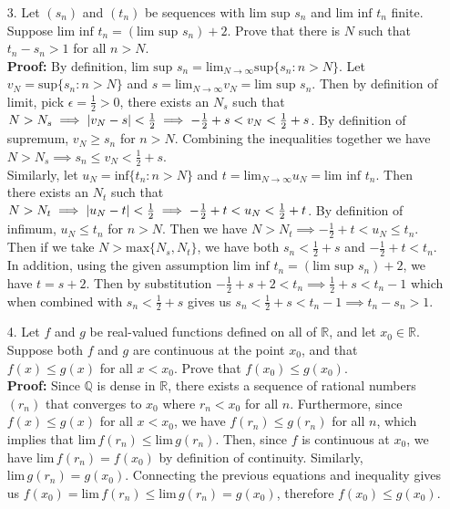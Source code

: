 \documentclass{article}
\begin{document}
\begin{itemize}
\end{itemize}
\newpage
\begin{itemize}
    \item [3.] Let $(s_n)$ and $(t_n)$ be sequences with $\text{lim sup }s_n$ and $\text{lim inf }t_n$ finite. Suppose $\text{lim inf }t_n=(\text{lim sup }s_n)+2$. Prove that there is $N$ such that $t_n-s_n>1$ for all $n>N$.\\
          \textbf{Proof: } By definition, $\text{lim sup }s_n=\text{lim}_{N\rightarrow\infty}\text{sup}\{s_n:n>N\}$. Let $v_N=\text{sup}\{s_n:n>N\}$ and $s=\text{lim}_{N\rightarrow\infty}v_N=\text{lim sup }s_n$. Then by definition of limit, pick $\epsilon=\frac{1}{2}>0$, there exists an $N_s$ such that $N>N_s\implies\abs{v_N-s}<\frac{1}{2}\implies -\frac{1}{2}+s<v_N<\frac{1}{2}+s$. By definition of supremum, $v_N\geq s_n$ for $n>N$. Combining the inequalities together we have $N>N_s\implies s_n\leq v_N<\frac{1}{2}+s$.\\
          Similarly, let $u_N=\text{inf}\{t_n:n>N\}$ and $t=\text{lim}_{N\rightarrow\infty}u_N=\text{lim inf }t_n$. Then there exists an $N_t$ such that $N>N_t\implies\abs{u_N-t}<\frac{1}{2}\implies -\frac{1}{2}+t<u_N<\frac{1}{2}+t$. By definition of infimum, $u_N\leq t_n$ for $n>N$. Then we have $N>N_t\implies -\frac{1}{2}+t<u_N\leq t_n$.\\
          Then if we take $N>\text{max}\{N_s,N_t\}$, we have both $s_n<\frac{1}{2}+s$ and $-\frac{1}{2}+t<t_n$. In addition, using the given assumption $\text{lim inf }t_n=(\text{lim sup }s_n)+2$, we have $t=s+2$. Then by substitution $-\frac{1}{2}+s+2<t_n\implies\frac{1}{2}+s<t_n-1$ which when combined with $s_n<\frac{1}{2}+s$ gives us $s_n<\frac{1}{2}+s<t_n-1\implies t_n-s_n>1$.
\end{itemize}
\newpage
\begin{itemize}
    \item [4.] Let $f$ and $g$ be real-valued functions defined on all of $\mathbb{R}$, and let $x_0\in\mathbb{R}$. Suppose both $f$ and $g$ are continuous at the point $x_0$, and that $f(x)\leq g(x)$ for all $x<x_0$. Prove that $f(x_0)\leq g(x_0)$.\\
          \textbf{Proof: } Since $\mathbb{Q}$ is dense in $\mathbb{R}$, there exists a sequence of rational numbers $(r_n)$ that converges to $x_0$ where $r_n<x_0$ for all $n$. Furthermore, since $f(x)\leq g(x)$ for all $x<x_0$, we have $f(r_n)\leq g(r_n)$ for all $n$, which implies that $\text{lim}\,f(r_n)\leq\text{lim}\,g(r_n)$. Then, since $f$ is continuous at $x_0$, we have $\text{lim}\,f(r_n)=f(x_0)$ by definition of continuity. Similarly, $\text{lim}\,g(r_n)=g(x_0)$. Connecting the previous equations and inequality gives us $f(x_0)=\text{lim}\,f(r_n)\leq\text{lim}\,g(r_n)=g(x_0)$, therefore $f(x_0)\leq g(x_0)$.
\end{itemize}
\end{document}
